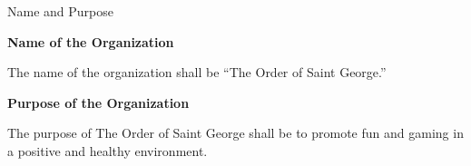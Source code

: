 {
\begin{article}{Name and Purpose}
	\item \textbf{Name of the Organization}

	The name of the organization shall be \enquote{The Order of Saint George.}
	\item \textbf{Purpose of the Organization}

	The purpose of The Order of Saint George shall be to promote fun and gaming in a positive and healthy environment.
\end{article}
}